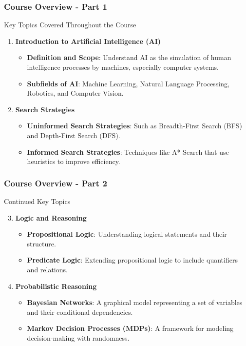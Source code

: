 \documentclass[aspectratio=169]{beamer}
\begin{document}
\begin{frame}[fragile]
    \frametitle{Course Overview - Part 1}
    \begin{block}{Key Topics Covered Throughout the Course}
        \begin{enumerate}
            \item \textbf{Introduction to Artificial Intelligence (AI)}
                \begin{itemize}
                    \item \textbf{Definition and Scope}: Understand AI as the simulation of human intelligence processes by machines, especially computer systems.
                    \item \textbf{Subfields of AI}: Machine Learning, Natural Language Processing, Robotics, and Computer Vision.
                \end{itemize}
            \item \textbf{Search Strategies}
                \begin{itemize}
                    \item \textbf{Uninformed Search Strategies}: Such as Breadth-First Search (BFS) and Depth-First Search (DFS).
                    \item \textbf{Informed Search Strategies}: Techniques like A* Search that use heuristics to improve efficiency.
                \end{itemize}
        \end{enumerate}
    \end{block}
\end{frame}

\begin{frame}[fragile]
    \frametitle{Course Overview - Part 2}
    \begin{block}{Continued Key Topics}
        \begin{enumerate}
            \setcounter{enumi}{2}
            \item \textbf{Logic and Reasoning}
                \begin{itemize}
                    \item \textbf{Propositional Logic}: Understanding logical statements and their structure.
                    \item \textbf{Predicate Logic}: Extending propositional logic to include quantifiers and relations.
                \end{itemize}
            \item \textbf{Probabilistic Reasoning}
                \begin{itemize}
                    \item \textbf{Bayesian Networks}: A graphical model representing a set of variables and their conditional dependencies.
                    \item \textbf{Markov Decision Processes (MDPs)}: A framework for modeling decision-making with randomness.
                \end{itemize}
        \end{enumerate}
    \end{block}
\end{frame}
\end{document}
